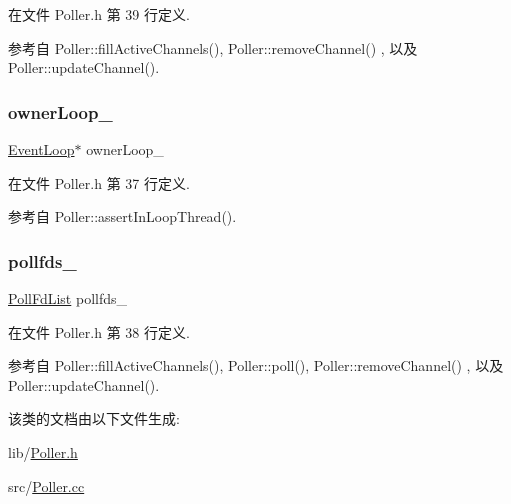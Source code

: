 在文件 Poller.\+h 第 39 行定义.



参考自 Poller\+::fill\+Active\+Channels(), Poller\+::remove\+Channel() , 以及 Poller\+::update\+Channel().

\mbox{\label{classmuduo_1_1Poller_ab7cf856df3fd0f8496fcf3b59b8a24ab}} 
\subsubsection{\texorpdfstring{owner\+Loop\+\_\+}{ownerLoop\_}}
{\footnotesize\ttfamily \hyperlink{classmuduo_1_1EventLoop}{Event\+Loop}$\ast$ owner\+Loop\+\_\+\hspace{0.3cm}{\ttfamily [private]}}



在文件 Poller.\+h 第 37 行定义.



参考自 Poller\+::assert\+In\+Loop\+Thread().

\mbox{\label{classmuduo_1_1Poller_abbd39d01f8545e75e218de725997abc3}} 
\subsubsection{\texorpdfstring{pollfds\+\_\+}{pollfds\_}}
{\footnotesize\ttfamily \hyperlink{classmuduo_1_1Poller_a0cf1be2f572740022edada139cacfb12}{Poll\+Fd\+List} pollfds\+\_\+\hspace{0.3cm}{\ttfamily [private]}}



在文件 Poller.\+h 第 38 行定义.



参考自 Poller\+::fill\+Active\+Channels(), Poller\+::poll(), Poller\+::remove\+Channel() , 以及 Poller\+::update\+Channel().



该类的文档由以下文件生成\+:\begin{DoxyCompactItemize}
\item 
lib/\hyperlink{Poller_8h}{Poller.\+h}\item 
src/\hyperlink{Poller_8cc}{Poller.\+cc}\end{DoxyCompactItemize}
